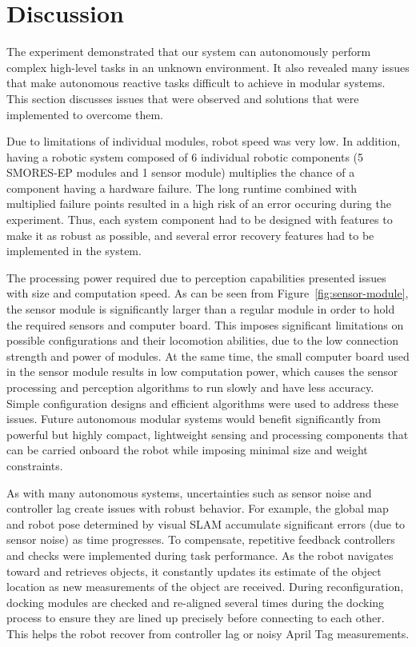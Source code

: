 \documentclass[conference]{IEEEtran}
\begin{document}
\section{Discussion}
\label{sec:discussion}
%
The experiment demonstrated that our system can autonomously perform complex high-level tasks in an unknown environment. It also revealed many issues that make autonomous reactive tasks difficult to achieve in modular systems. This section discusses issues that were observed and solutions that were implemented to overcome them.

Due to limitations of individual modules, robot speed was very low. In addition, having a robotic system composed of 6 individual robotic components (5 SMORES-EP modules and 1 sensor module) multiplies the chance of a component having a hardware failure. The long runtime combined with multiplied failure points resulted in a high risk of an error occuring during the experiment. Thus, each system component had to be designed with features to make it as robust as possible, and several error recovery features had to be implemented in the system.

The processing power required due to perception capabilities presented issues with size and computation speed. As can be seen from Figure~\ref{fig:sensor-module}, the sensor module is significantly larger than a regular module in order to hold the required sensors and computer board. This imposes significant limitations on possible configurations and their locomotion abilities, due to the low connection strength and power of modules. At the same time, the small computer board used in the sensor module results in low computation power, which causes the sensor processing and perception algorithms to run slowly and have less accuracy. Simple configuration designs and efficient algorithms were used to address these issues. Future autonomous modular systems would benefit significantly from powerful but highly compact, lightweight sensing and processing components that can be carried onboard the robot while imposing minimal size and weight constraints.

As with many autonomous systems, uncertainties such as sensor noise and controller lag create issues with robust behavior. For example, the global map and robot pose determined by visual SLAM accumulate significant errors (due to sensor noise) as time progresses. To compensate, repetitive feedback controllers and checks were implemented during task performance. As the robot navigates toward and retrieves objects, it constantly updates its estimate of the object location as new measurements of the object are received. During reconfiguration, docking modules are checked and re-aligned several times during the docking process to ensure they are lined up precisely before connecting to each other. This helps the robot recover from controller lag or noisy April Tag measurements.
\end{document}
